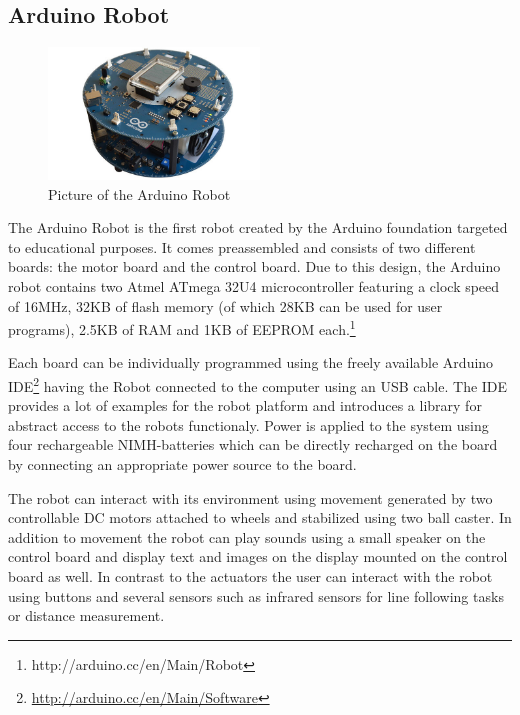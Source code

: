 \documentclass[11pt,a4paper]{article}
\begin{document}
\subsection{Arduino Robot}
\begin{figure}[h!]
  \centering
  \includegraphics[width=0.5\textwidth]{images/arduinorobot.jpg}
  \caption{Picture of the Arduino Robot}
\end{figure}

The Arduino Robot is the first robot created by the Arduino foundation targeted to educational purposes. It comes preassembled and consists of two different boards: the motor board and the control board. Due to this design, the Arduino robot contains two Atmel ATmega 32U4 microcontroller featuring a clock speed of 16MHz, 32KB of flash memory (of which 28KB can be used for user programs), 2.5KB of RAM and 1KB of EEPROM each.\footnote{{http://arduino.cc/en/Main/Robot}}

Each board can be individually programmed using the freely available Arduino IDE\footnote{\url{http://arduino.cc/en/Main/Software}} having the Robot connected to the computer using an USB cable. The IDE provides a lot of examples for the robot platform and introduces a library for abstract access to the robots functionaly. Power is applied to the system using four rechargeable NIMH-batteries which can be directly recharged on the board by connecting an appropriate power source to the board.

The robot can interact with its environment using movement generated by two controllable DC motors attached to wheels and stabilized using two ball caster. In addition to movement the robot can play sounds using a small speaker on the control board and display text and images on the display mounted on the control board as well. In contrast to the actuators the user can interact with the robot using buttons and several sensors such as infrared sensors for line following tasks or distance measurement.
\end{document}
